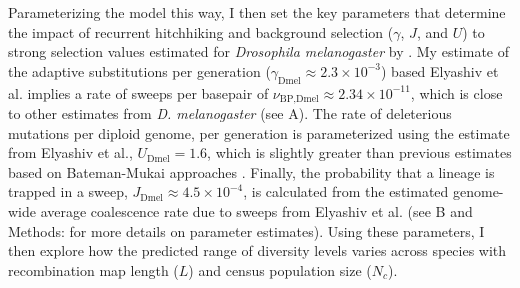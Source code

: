 \documentclass[9pt,lineno]{elife}
\begin{document}
Parameterizing the model this way, I then set the key parameters that determine
the impact of recurrent hitchhiking and background selection ($\gamma$, $J$,
and $U$) to strong selection values estimated for \emph{Drosophila
melanogaster} by \cite{Elyashiv2016-vt}. My estimate of the adaptive
substitutions per generation ($\gamma_\text{Dmel} \approx 2.3 \times 10^{-3}$)
based Elyashiv et al.  implies a rate of sweeps per basepair of
$\nu_\text{BP,Dmel} \approx 2.34 \times 10^{-11}$, which is close to other
estimates from \emph{D.  melanogaster} (see
A). The rate of deleterious mutations per
diploid genome, per generation is parameterized using the estimate from
Elyashiv et al., $U_\text{Dmel} = 1.6$, which is slightly greater than previous
estimates based on Bateman-Mukai approaches
\citep{Mukai1985-bc,Mukai1988-vs,Charlesworth1987-ab}. Finally, the probability
that a lineage is trapped in a sweep, $J_\text{Dmel} \approx 4.5 \times
10^{-4}$, is calculated from the estimated genome-wide average coalescence rate
due to sweeps from Elyashiv et al. (see B
and Methods:  for more details on parameter
estimates).  Using these parameters, I then explore how the predicted range of
diversity levels varies across species with recombination map length ($L$) and
census population size ($N_c$).
\end{document}
